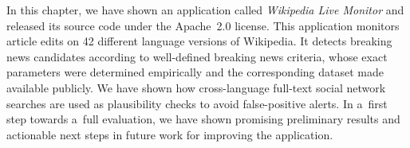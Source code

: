 In this chapter, we have shown an application called \emph{Wikipedia Live Monitor}
and released its source code under the Apache~2.0 license.
This application monitors article edits on 42 different language versions of Wikipedia.
It detects breaking news candidates according to well-defined breaking news criteria,
whose exact parameters were determined empirically
and the corresponding dataset made available publicly.
We have shown how cross-language full-text social network searches are used
as plausibility checks to avoid false-positive alerts.
In a~first step towards a~full evaluation,
we have shown promising preliminary results
and actionable next steps in future work for improving the application.



